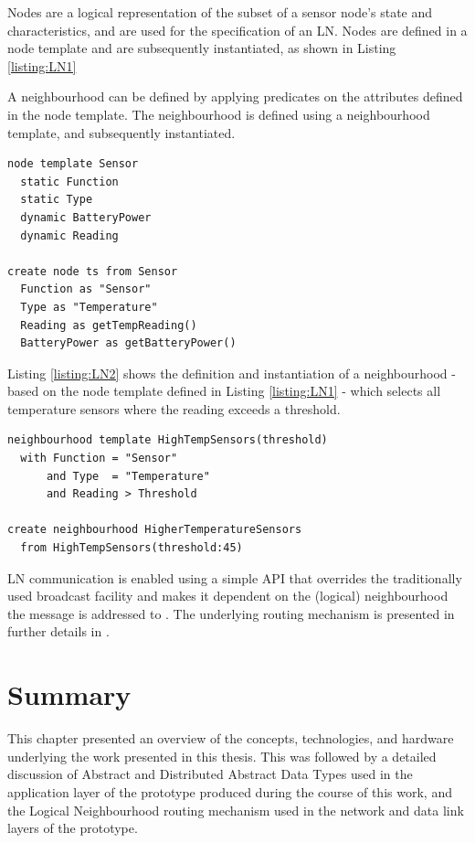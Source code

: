 Nodes are a logical representation of the subset of a sensor node's state and
characteristics, and are used for the specification of an LN. Nodes are defined
in a node template and are subsequently instantiated, as shown in Listing \ref{listing:LN1}
   
A neighbourhood can be defined by applying predicates on the attributes defined
in the node template. The neighbourhood is defined using a neighbourhood
template, and subsequently instantiated.
   
\begin{lstlisting}[frame=trbl, basewidth={0.55em, 0.6em}, captionpos=b, 
basicstyle=\ttfamily\footnotesize, breaklines, caption = Node Definition and Instantiation, label = listing:LN1]  
node template Sensor
  static Function
  static Type
  dynamic BatteryPower
  dynamic Reading

create node ts from Sensor
  Function as "Sensor"
  Type as "Temperature"
  Reading as getTempReading()
  BatteryPower as getBatteryPower()
\end{lstlisting}


Listing \ref{listing:LN2} shows the definition and
instantiation of a
neighbourhood - based on the node template defined in Listing \ref{listing:LN1}
- which selects all temperature sensors where the reading exceeds a threshold.
 
\begin{lstlisting}[frame=trbl, basewidth={0.55em, 0.6em}, captionpos=b, 
basicstyle=\ttfamily\footnotesize, breaklines, caption = Neighbourhood Definition and Instantiation, label = listing:LN2]  
neighbourhood template HighTempSensors(threshold)
  with Function = "Sensor" 
      and Type  = "Temperature" 
      and Reading > Threshold

create neighbourhood HigherTemperatureSensors
  from HighTempSensors(threshold:45)
\end{lstlisting}

LN communication is enabled using a simple API that overrides the
traditionally used broadcast facility and makes it dependent on the (logical)
neighbourhood the message is addressed to \cite{mottola_LN:2006}. The underlying routing mechanism is presented in further
details in \cite{mottola_LN:2006, mottola_LNScoping:2006}.

\section{Summary}

This chapter presented an overview of the concepts, technologies, and hardware
underlying the work presented in this thesis. This was followed by a detailed
discussion of Abstract
and Distributed Abstract Data Types used in the application layer of the
prototype produced during the course of this work, and the Logical Neighbourhood
routing mechanism used in the network and data link layers of the prototype. 


  